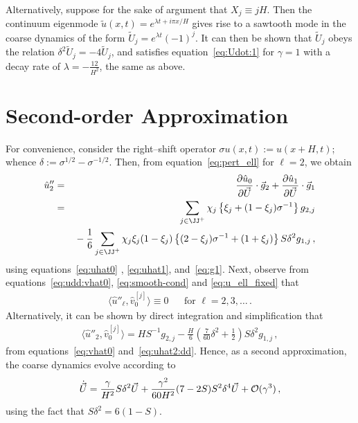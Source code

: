 \documentclass[12pt,a5paper]{article}
\begin{document}
Alternatively, suppose for the sake of argument that $X_j\equiv jH$. Then the continuum eigenmode $\tilde{u}(x,t)=e^{\lambda t+i\pi x/H}$ 
gives rise to a sawtooth mode in the coarse dynamics of the form $\tilde{U}_j=e^{\lambda t}(-1)^{j}$.
It can then be shown that $\tilde{U}_j$ obeys the relation $\delta^2\tilde{U}_j=-4\tilde{U}_j$,
and satisfies equation~\eqref{eq:Udot:1} for $\gamma=1$ with a decay rate of $\lambda=-\frac{12}{H^2}$, the same as above.

\section{Second-order Approximation}
For convenience, consider the right--shift operator $\sigma u(x,t) := u(x+H,t)$;
 whence $\delta:=\sigma^{{1}/{2}}-\sigma^{-{1}/{2}}$.
Then, from equation~\eqref{eq:pert_ell} for $\ell=2$, we obtain
\begin{eqnarray}
  \hat{u}''_2 & = & \D{\vec U}{\hat{u}_0}\cdot{\vec g}_{2}+\D{\vec U}{\hat{u}_1}\cdot{\vec g}_{1}
\nonumber\\
& = & \sum_{j\in\JJ^+}\chi_j\left\{\xi_j+(1-\xi_j)\sigma^{-1}\right\}g_{2,j}
\nonumber\\
&& {}-\frac{1}{6}\sum_{j\in\JJ^+}\chi_j\xi_j(1-\xi_j)\left\{
(2-\xi_j)\sigma^{-1}+(1+\xi_j)
\right\}S\delta^2g_{1,j}\,,
\label{eq:uhat2:dd}
\end{eqnarray}
using equations~\eqref{eq:uhat0} , \eqref{eq:uhat1}, and~\eqref{eq:g1}.
Next, observe 
from equations~\eqref{eq:udd:vhat0}, \eqref{eq:smooth-cond} and \eqref{eq:u_ell_fixed} that
\begin{eqnarray}
\langle\hat{u}''_\ell,\hat{v}_0^{[j]}\rangle\equiv0 && \mbox{for }\ell=2,3,\ldots\,.
\end{eqnarray}
Alternatively, it can be shown by direct integration and simplification that
\begin{eqnarray}
\langle\hat{u}''_2,\hat{v}_0^{[j]}\rangle = HS^{-1}g_{2,j}-\frac{H}{6}\left(\frac{7}{60}\delta^2+\frac{1}{2}\right)S\delta^2g_{1,j}\,,
\end{eqnarray}
from equations~\eqref{eq:vhat0} and~\eqref{eq:uhat2:dd}.
Hence, as a second approximation, the coarse dynamics evolve according to
\begin{eqnarray}
	\dot{\vec U} = \frac{\gamma}{H^2}S\delta^2\vec U 
+ \frac{\gamma^2}{60H^2}(7-2S)S^2\delta^4\vec U
+ {\cal O}(\gamma^3)\,,
\end{eqnarray}
using the fact that $S\delta^2=6(1-S)$.
\end{document}
